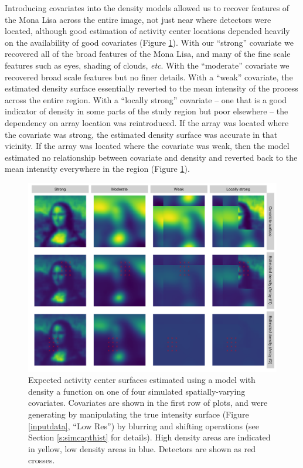 \documentclass[10pt,a4paper]{article}
\begin{document}
Introducing covariates into the density models allowed us to recover features of the Mona Lisa across the entire image, not just near where detectors were located, although good estimation of activity center locations depended heavily on the availability of good covariates (Figure \ref{covariates}). With our ``strong'' covariate we recovered all of the broad features of the Mona Lisa, and many of the fine scale features such as eyes, shading of clouds, {\it etc}. With the ``moderate'' covariate we recovered broad scale features but no finer details. With a ``weak'' covariate, the estimated density surface essentially reverted to the mean intensity of the process across the entire region. With a ``locally strong'' covariate -- one that is a good indicator of density in some parts of the study region but poor elsewhere -- the dependency on array location was reintroduced. If the array was located where the covariate was strong, the estimated density surface was accurate in that vicinity. If the array was located where the covariate was weak, then the model estimated no relationship between covariate and density and reverted back to the mean intensity everywhere in the region (Figure \ref{covariates}). 

\begin{figure}[htbp]
\centering
\includegraphics[width=1\textwidth]{mona_covariates.png}
\caption{Expected activity center surfaces estimated using a model with density a function on one of four simulated spatially-varying covariates. Covariates are shown in the first row of plots, and were generating by manipulating the true intensity surface (Figure \ref{inputdata}, ``Low Res'') by blurring and shifting operations (see Section \ref{s:simcapthist} for details). High density areas are indicated in yellow, low density areas in blue. Detectors are shown as red crosses.} 
\label{covariates}
\end{figure}
\end{document}
